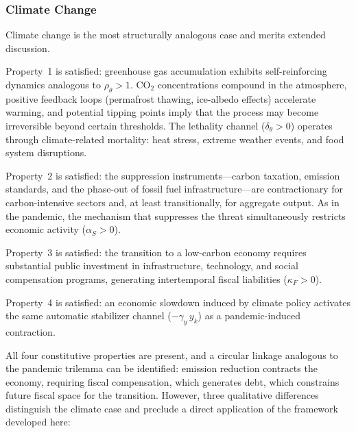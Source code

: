 \documentclass[12pt, a4paper]{article}
\begin{document}
\subsubsection*{Climate Change}

Climate change is the most structurally analogous case and merits extended discussion.

Property~1 is satisfied: greenhouse gas accumulation exhibits self-reinforcing dynamics analogous to $\rho_\theta > 1$. CO$_2$ concentrations compound in the atmosphere, positive feedback loops (permafrost thawing, ice-albedo effects) accelerate warming, and potential tipping points imply that the process may become irreversible beyond certain thresholds. The lethality channel ($\delta_\theta > 0$) operates through climate-related mortality: heat stress, extreme weather events, and food system disruptions.

Property~2 is satisfied: the suppression instruments---carbon taxation, emission standards, and the phase-out of fossil fuel infrastructure---are contractionary for carbon-intensive sectors and, at least transitionally, for aggregate output. As in the pandemic, the mechanism that suppresses the threat simultaneously restricts economic activity ($\alpha_S > 0$).

Property~3 is satisfied: the transition to a low-carbon economy requires substantial public investment in infrastructure, technology, and social compensation programs, generating intertemporal fiscal liabilities ($\kappa_F > 0$).

Property~4 is satisfied: an economic slowdown induced by climate policy activates the same automatic stabilizer channel ($-\gamma_y \, y_k$) as a pandemic-induced contraction.

All four constitutive properties are present, and a circular linkage analogous to the pandemic trilemma can be identified: emission reduction contracts the economy, requiring fiscal compensation, which generates debt, which constrains future fiscal space for the transition. However, three qualitative differences distinguish the climate case and preclude a direct application of the framework developed here:
\end{document}
